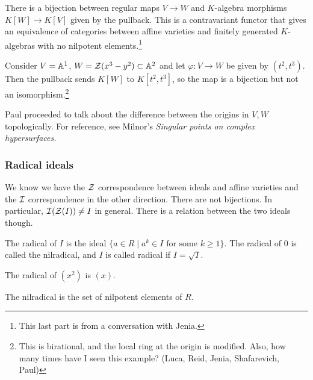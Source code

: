 \documentclass[10pt, twoside]{article}
\begin{document}
        \begin{thm} There is a bijection between regular maps $V \to W$ and
            $K$-algebra morphisms $K[W] \to K[V]$ given by the pullback. This
            is a contravariant functor that gives an equivalence of categories
            between affine varieties and finitely generated $K$-algebras with
            no nilpotent elements.\footnote{This last part is from a
            conversation with Jenia.} \end{thm}

        \begin{exm} Consider $V = \mathbb{A}^1$, $W = \mathcal{Z}(x^3-y^2) \subset \mathbb{A}^2$ and
            let $\varphi: V \to W$ be given by $(t^2, t^3)$. Then the pullback
            sends $K[W]$ to $K[t^2,t^3]$, so the map is a bijection but not an
            isomorphism.\footnote{This is birational, and the local ring at the
            origin is modified. Also, how many times have I seen this example?
        (Luca, Reid, Jenia, Shafarevich, Paul)} \end{exm}

        Paul proceeded to talk about the difference between the origins in
        $V,W$ topologically. For reference, see Milnor's \emph{Singular points
        on complex hypersurfaces.}

        \subsubsection{Radical ideals} We know we have the $\mathcal{Z}$
        correspondence between ideals and affine varieties and the $\mathcal{I}$
        correspondence in the other direction. There are not bijections. In
        particular, $\mathcal{I}(\mathcal{Z}(I)) \neq I$ in general. There is a relation
        between the two ideals though.

        \begin{defn} The radical of $I$ is the ideal $\{a \in R \mid a^k \in I
        \text{ for some }k\geq 1\}$. The radical of $0$ is called the
    nilradical, and $I$ is called radical if $I=\sqrt{I}$.  \end{defn}

        \begin{exm} The radical of $(x^2)$ is $(x)$.  \end{exm}

    \begin{exm} The nilradical is the set of nilpotent elements of $R$.
    \end{exm}
\end{document}
